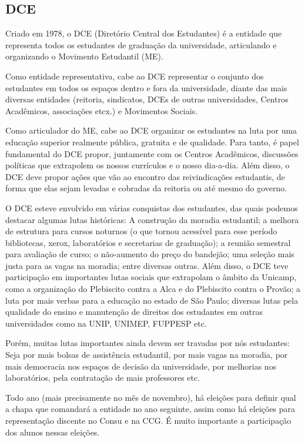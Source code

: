\subsection{DCE}

Criado em 1978, o DCE (Diretório Central dos Estudantes) é a entidade que
representa todos os estudantes de graduação da universidade, articulando
e organizando o Movimento Estudantil (ME).

Como entidade representativa, cabe ao DCE representar o conjunto dos
estudantes em todos os espaços dentro e fora da universidade, diante das mais
diversas entidades (reitoria, sindicatos, DCEs de outras universidades, Centros
Acadêmicos, associações etcx.) e Movimentos Sociais.

Como articulador do ME, cabe ao DCE organizar os estudantes na luta por uma
educação superior realmente pública, gratuita e de qualidade. Para tanto,
é papel fundamental do DCE propor, juntamente com os Centros Acadêmicos,
discussões políticas que extrapolem os nossos currículos e o nosso dia-a-dia.
Além disso, o DCE deve propor ações que vão ao encontro das reivindicações
estudantis, de forma que elas sejam levadas e cobradas da reitoria ou até mesmo
do governo.

O DCE esteve envolvido em várias conquistas dos estudantes, das quais podemos
destacar algumas lutas históricas: A construção da moradia estudantil; a melhora
de estrutura para cursos noturnos (o que tornou acessível para esse período
bibliotecas, xerox, laboratórios e secretarias de graduação); a reunião semestral
para avaliação de curso; o não-aumento do preço do bandejão; uma seleção mais
justa para as vagas na moradia; entre diversas outras. Além disso, o DCE teve
participação em importantes lutas sociais que extrapolam o âmbito da Unicamp,
como a organização do Plebiscito contra a Alca e do Plebiscito contra o Provão;
a luta por mais verbas para a educação no estado de São Paulo; diversas lutas
pela qualidade do ensino e manutenção de direitos dos estudantes em outras
universidades como na UNIP, UNIMEP, FUPPESP etc.

Porém, muitas lutas importantes ainda devem ser travadas por nós estudantes:
Seja por mais bolsas de assistência estudantil, por mais vagas na moradia, por
mais democracia nos espaços de decisão da universidade, por melhorias nos
laboratórios, pela contratação de mais professores etc.

Todo ano (mais precisamente no mês de novembro), há eleições para definir qual
a chapa que comandará a entidade no ano seguinte, assim como há eleições para
representação discente no Consu e na CCG. É muito importante a participação dos
alunos nessas eleições.

